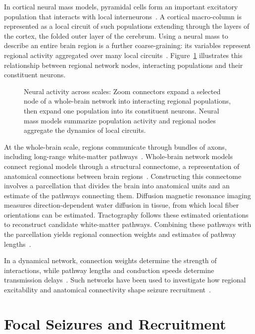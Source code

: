 In cortical neural mass models, pyramidal cells form an important excitatory population that interacts with local interneurons~\cite{Jansen1995}.
A cortical macro-column is represented as a local circuit of such populations extending through the layers of the cortex, the folded outer layer of the cerebrum.
Using a neural mass to describe an entire brain region is a further coarse-graining: its variables represent regional activity aggregated over many local circuits~\cite{SanzLeon2013,SanzLeon2015}.
Figure~\ref{fig:neural_scales} illustrates this relationship between regional network nodes, interacting populations and their constituent neurons.

\begin{figure}
    \centering
    
    \caption{Neural activity across scales: Zoom connectors expand a selected node of a whole-brain network into interacting regional populations, then expand one population into its constituent neurons. Neural mass models summarize population activity and regional nodes aggregate the dynamics of local circuits.}
    \label{fig:neural_scales}
\end{figure}

At the whole-brain scale, regions communicate through bundles of axons, including long-range white-matter pathways~\cite{Hagmann2008}.
Whole-brain network models connect regional models through a structural connectome, a representation of anatomical connections between brain regions~\cite{SanzLeon2013}.
Constructing this connectome involves a parcellation that divides the brain into anatomical units and an estimate of the pathways connecting them.
Diffusion magnetic resonance imaging measures direction-dependent water diffusion in tissue, from which local fiber orientations can be estimated.
Tractography follows these estimated orientations to reconstruct candidate white-matter pathways.
Combining these pathways with the parcellation yields regional connection weights and estimates of pathway lengths~\cite{Hagmann2008}.

In a dynamical network, connection weights determine the strength of interactions, while pathway lengths and conduction speeds determine transmission delays~\cite{SanzLeon2015}.
Such networks have been used to investigate how regional excitability and anatomical connectivity shape seizure recruitment~\cite{Olmi2019}.

\section{Focal Seizures and Recruitment}
\label{sec:seizure_recruitment_background}

